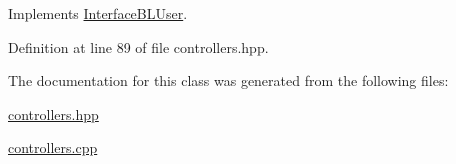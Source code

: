 Implements \hyperlink{class_interface_b_l_user_ad68d0903bc24cf0fa3538be028831783}{Interface\+B\+L\+User}.



Definition at line 89 of file controllers.\+hpp.



The documentation for this class was generated from the following files\+:\begin{DoxyCompactItemize}
\item 
\hyperlink{controllers_8hpp}{controllers.\+hpp}\item 
\hyperlink{controllers_8cpp}{controllers.\+cpp}\end{DoxyCompactItemize}
